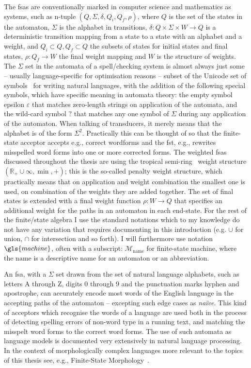 \documentclass[officiallayout,final]{unihelcompling}
\begin{document}
The \glspl{fsa} are conventionally marked in computer science and mathematics
as systems, such as n-tuple $(Q, \Sigma, \delta, Q_i, Q_f, \rho)$, where $Q$ is
the set of the states in the automaton, $\Sigma$ is the alphabet in
transitions, $\delta: Q \times \Sigma \times W \rightarrow Q$ is a
deterministic transition mapping from a state to a state with an alphabet and a
weight, and $Q_i \subset Q, Q_f \subset Q$ the subsets of states for initial
states and final states, $\rho: Q_f \rightarrow W$ the final weight mapping and
$W$ is the structure of weights.  The $\Sigma$ set in the automata of a
spell\-/checking system is almost always just some -- usually language-specific
for optimisation reasons -- subset of the Unicode set of
symbols~\citep{unicode} for writing natural languages, with the addition of the
following special symbols, which have specific meaning in automata theory: the
empty symbol epsilon $\varepsilon$ that matches zero-length strings on application
of the automata, and the wild-card symbol $?$ that matches any one symbol of
$\Sigma$ during any application of the automaton.  When talking of transducers,
it merely means that the alphabet is of the form $\Sigma^2$. Practically this
can be thought of so that the \gls{finite-state acceptor} accepts e.g., correct
wordforms and the \gls{fst}, e.g., rewrites misspelled word forms into one or
more corrected forms.  The weighted \glspl{fsa} discussed throughout the thesis
are using the \gls{tropical semi-ring}~\citep{mohri1997finitestate} weight
structure $(\mathbb{R}_+ \cup \infty, \min, +)$; this is the so-called penalty
weight structure, which practically means that on application and weight
combination the smallest one is used, on combination of the weights they are
added together. The set of final states is extended with a final weight
function $\rho: W \rightarrow Q$ that specifies an additional weight for the
paths in an automaton in each end-state. For the rest of the finite\-/state
algebra I use the standard notations which to my knowledge do not have any
variation that requires documenting in this introduction (e.g.  $\cup$ for
union, $\cap$ for intersection and so forth). I will furthermore use notation
$\gls{machine}$, often with a subscript: $\mathcal{M}_\mathrm{name}$ for
finite-state machine, where the $\mathrm{name}$ is a descriptive name for an
automaton or an abbreviation.

An \gls{fsa}, with a $\Sigma$ set drawn from the set of natural language
alphabets, such as letters A through Z, digits 0 through 9 and the punctuation
marks hyphen and apostrophe, can accurately encode most words of the English
language in the accepting paths of the automaton -- excepting such edge cases
as \emph{naïve}. This kind of acceptors which recognise the words of a language
are used both in the process of detecting spelling errors of non-word type in a
running text, and matching the misspelt word forms to the correct word forms.
The use of such automata as language models is documented very extensively in
natural language processing.  In the context of morphologically complex
languages more relevant to the topics of this thesis see, e.g., Finite-State
Morphology~\citep{beesley2003finite,beesley2004morphological}.
\end{document}
